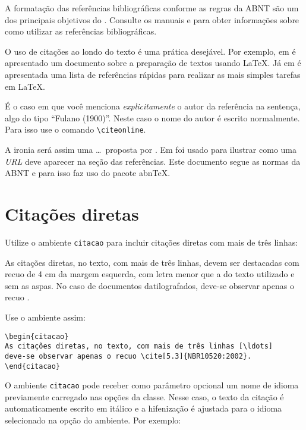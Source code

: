 A formatação das referências bibliográficas conforme as regras da ABNT são um dos principais objetivos do \abnTeX. Consulte os manuais  e  para obter informações sobre como utilizar as referências bibliográficas.


O uso de citações ao londo do texto é uma prática desejável. Por exemplo, em \cite{lamport94} é apresentado um documento sobre a preparação de textos usando \LaTeX. Já em \cite{goossens94} é apresentada uma lista de referências rápidas para realizar as mais simples tarefas em \LaTeX.

É o caso em que você menciona \emph{explicitamente} o autor da referência na sentença, algo
do tipo ``Fulano (1900)''. Neste caso o nome do autor é escrito
normalmente. Para isso use o comando \verb+\citeonline+.

A ironia será assim uma \ldots\ proposta  por . Em \cite{exemplo} foi usado para ilustrar como uma \textit{URL} deve aparecer na seção das referências. Este documento segue as normas da \gls{ABNT} e para isso faz uso do pacote \gls{abnTeX}.


\section{Citações diretas}
\label{sec-citacao}

Utilize o ambiente \texttt{citacao} para incluir
citações diretas com mais de três linhas:

\begin{citacao}
As citações diretas, no texto, com mais de três linhas, devem ser
destacadas com recuo de 4 cm da margem esquerda, com letra menor que a do texto
utilizado e sem as aspas. No caso de documentos datilografados, deve-se
observar apenas o recuo \cite[5.3]{NBR10520:2002}.
\end{citacao}

Use o ambiente assim:

\begin{verbatim}
\begin{citacao}
As citações diretas, no texto, com mais de três linhas [\ldots] 
deve-se observar apenas o recuo \cite[5.3]{NBR10520:2002}.
\end{citacao}
\end{verbatim}

O ambiente \texttt{citacao} pode receber como parâmetro opcional um nome de
idioma previamente carregado nas opções da classe. Nesse
caso, o texto da citação é automaticamente escrito em itálico e a hifenização é
ajustada para o idioma selecionado na opção do ambiente. Por exemplo:

